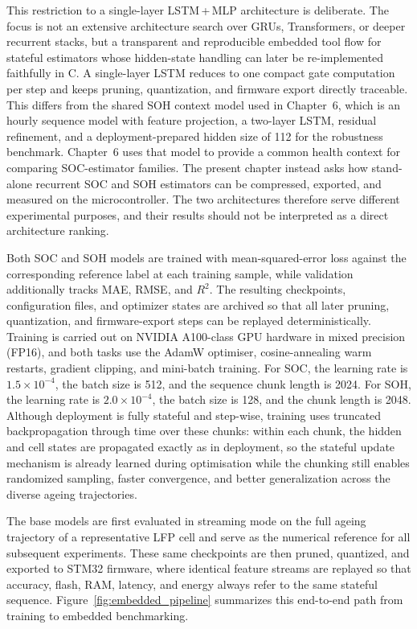\documentclass[
    a4paper,
    12pt,
    titlepage,
    bibliography=totoc,
    twoside=on,
    parskip=false,
    numbers=noenddot,
    cleardoublepage=empty,
    DIV=12,
    BCOR=12.0mm,
    headheight=36pt,
    headings=openright
]{scrreprt}
\begin{document}
This restriction to a single-layer LSTM\,+\,MLP architecture is deliberate. The focus is not an extensive architecture search over GRUs, Transformers, or deeper recurrent stacks, but a transparent and reproducible embedded tool flow for stateful estimators whose hidden-state handling can later be re-implemented faithfully in C. A single-layer LSTM reduces to one compact gate computation per step and keeps pruning, quantization, and firmware export directly traceable. This differs from the shared SOH context model used in Chapter~6, which is an hourly sequence model with feature projection, a two-layer LSTM, residual refinement, and a deployment-prepared hidden size of 112 for the robustness benchmark. Chapter~6 uses that model to provide a common health context for comparing SOC-estimator families. The present chapter instead asks how stand-alone recurrent SOC and SOH estimators can be compressed, exported, and measured on the microcontroller. The two architectures therefore serve different experimental purposes, and their results should not be interpreted as a direct architecture ranking.

Both SOC and SOH models are trained with mean-squared-error loss against the corresponding reference label at each training sample, while validation additionally tracks MAE, RMSE, and $R^2$. The resulting checkpoints, configuration files, and optimizer states are archived so that all later pruning, quantization, and firmware-export steps can be replayed deterministically. Training is carried out on NVIDIA A100-class GPU hardware in mixed precision (FP16), and both tasks use the AdamW optimiser, cosine-annealing warm restarts, gradient clipping, and mini-batch training.\autocite{loshchilovDecoupledWeightDecay2017,loshchilovSGDRStochasticGradient2016,micikeviciusMixedPrecisionTraining2017,pascanuDifficultyTrainingRecurrent2012} For SOC, the learning rate is $1.5\times10^{-4}$, the batch size is 512, and the sequence chunk length is 2024. For SOH, the learning rate is $2.0\times10^{-4}$, the batch size is 128, and the chunk length is 2048. Although deployment is fully stateful and step-wise, training uses truncated backpropagation through time over these chunks: within each chunk, the hidden and cell states are propagated exactly as in deployment, so the stateful update mechanism is already learned during optimisation while the chunking still enables randomized sampling, faster convergence, and better generalization across the diverse ageing trajectories.

The base models are first evaluated in streaming mode on the full ageing trajectory of a representative LFP cell and serve as the numerical reference for all subsequent experiments. These same checkpoints are then pruned, quantized, and exported to STM32 firmware, where identical feature streams are replayed so that accuracy, flash, RAM, latency, and energy always refer to the same stateful sequence. Figure~\ref{fig:embedded_pipeline} summarizes this end-to-end path from training to embedded benchmarking.
\end{document}
